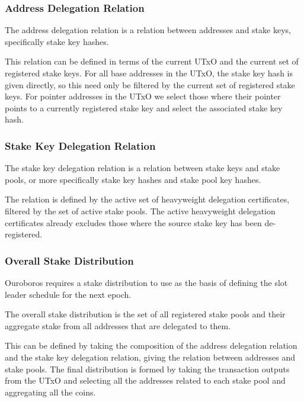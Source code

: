 \documentclass[11pt,a4paper]{article}
\begin{document}
\subsubsection{Address Delegation
Relation}\label{address-delegation-relation}

The address delegation relation is a relation between addresses and
stake keys, specifically stake key hashes.

This relation can be defined in terms of the current UTxO and the
current set of registered stake keys. For all base addresses in the
UTxO, the stake key hash is given directly, so this need only be
filtered by the current set of registered stake keys. For pointer
addresses in the UTxO we select those where their pointer points to a
currently registered stake key and select the associated stake key hash.

\subsubsection{Stake Key Delegation
Relation}\label{stake-key-delegation-relation}

The stake key delegation relation is a relation between stake keys and
stake pools, or more specifically stake key hashes and stake pool key
hashes.

The relation is defined by the active set of heavyweight delegation
certificates, filtered by the set of active stake pools. The active
heavyweight delegation certificates already excludes those where the
source stake key has been de-registered.

\subsubsection{Overall Stake
Distribution}\label{overall-stake-distribution}

Ouroboros \citep{ouroboros_classic} requires a stake distribution to
use as the basis of defining the slot leader schedule for the next
epoch.

The overall stake distribution is the set of all registered stake pools
and their aggregate stake from all addresses that are delegated to them.

This can be defined by taking the composition of the address delegation
relation and the stake key delegation relation, giving the relation
between addresses and stake pools. The final distribution is formed by
taking the transaction outputs from the UTxO and selecting all the
addresses related to each stake pool and aggregating all the coins.
\end{document}
